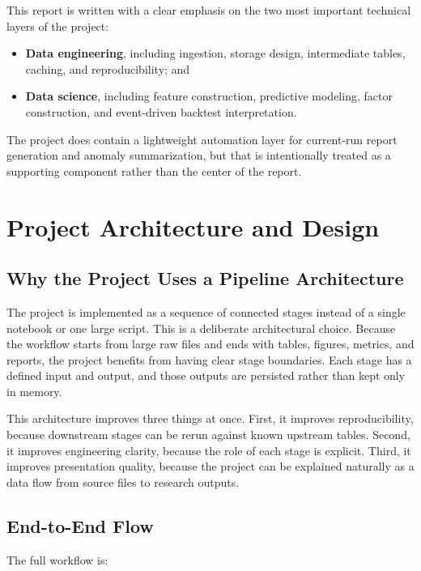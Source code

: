 \documentclass[11pt,a4paper]{article}
\begin{document}
This report is written with a clear emphasis on the two most important
technical layers of the project:

\begin{itemize}[leftmargin=*]
  \item \textbf{Data engineering}, including ingestion, storage design,
  intermediate tables, caching, and reproducibility; and
  \item \textbf{Data science}, including feature construction, predictive
  modeling, factor construction, and event-driven backtest interpretation.
\end{itemize}

The project does contain a lightweight automation layer for current-run report
generation and anomaly summarization, but that is intentionally treated as a
supporting component rather than the center of the report.

\section{Project Architecture and Design}

\subsection{Why the Project Uses a Pipeline Architecture}

The project is implemented as a sequence of connected stages instead of a
single notebook or one large script. This is a deliberate architectural choice.
Because the workflow starts from large raw files and ends with tables, figures,
metrics, and reports, the project benefits from having clear stage boundaries.
Each stage has a defined input and output, and those outputs are persisted
rather than kept only in memory.

This architecture improves three things at once. First, it improves
reproducibility, because downstream stages can be rerun against known upstream
tables. Second, it improves engineering clarity, because the role of each stage
is explicit. Third, it improves presentation quality, because the project can
be explained naturally as a data flow from source files to research outputs.

\subsection{End-to-End Flow}

The full workflow is:
\end{document}
